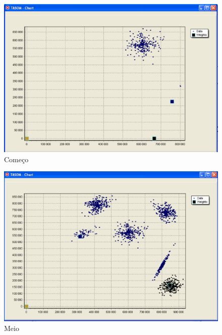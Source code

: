 \begin{figure}[!h]
\centering
\includegraphics[keepaspectratio=true,scale=0.5]
{figuras/tsom1.eps}
\caption{Começo}
\label{data_titatic}
\end{figure}  

\begin{figure}[!h]
\centering
\includegraphics[keepaspectratio=true,scale=0.5]
{figuras/tsom2.eps}
\caption{Meio}
\label{data_titatic}
\end{figure}

